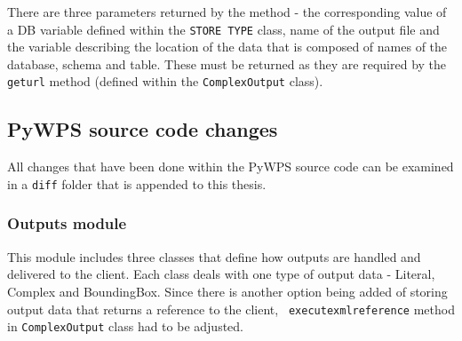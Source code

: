 There are three parameters returned by the method - the corresponding
value of a DB variable defined within the \texttt{STORE\textunderscore
  TYPE} class, name of the output file and the variable describing the
location of the data that is composed of names of the database, schema and table.
These must be returned as they are required by
the \texttt{get\textunderscore url} method (defined within the
\texttt{ComplexOutput} class).


\subsection{PyWPS source code changes} 

All changes that have been done within the PyWPS source code can be
examined in a \texttt{diff} folder that is appended to this thesis.


\subsubsection{Outputs module}

This module includes three classes that define how outputs are handled
and delivered to the client. Each class deals with one type of output
data - Literal, Complex and BoundingBox.
Since there is another option being added of storing output data that
returns a reference to the client, \texttt{\textunderscore
  execute\textunderscore xml\textunderscore reference} method in \texttt{ComplexOutput} class had to
be adjusted.

